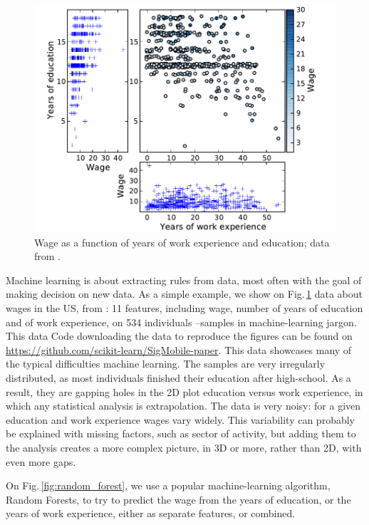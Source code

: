 \documentclass[a4paper]{article}
\begin{document}
\begin{figure}[b]
    \includegraphics[width=1.05\linewidth]{wage_data}%

    \caption{Wage as a function of years of work experience and
    education; data from \cite{berndt1991}\label{fig:data}.}
\end{figure}

Machine learning is about extracting rules from data, most often with the
goal of making decision on new data. As a simple example, we show on
Fig.\,\ref{fig:data} data about wages in the US, from \cite{berndt1991}:
11 features, including wage, number of years of education and of work
experience, on 534 individuals --samples in machine-learning
jargon. This data
Code downloading the data to reproduce the figures can be found on
\url{https://github.com/scikit-learn/SigMobile-paper}.
%
This data showcases many of the typical difficulties machine learning.
The samples are very irregularly distributed, as most individuals
finished their education after high-school. As a result, they are gapping
holes in the 2D plot education versus work experience, in which any
statistical analysis is extrapolation. The data is very noisy: for a
given education and work experience wages vary widely. This variability
can probably be explained with missing factors, such as sector of
activity, but adding them to the analysis creates a more complex picture,
in 3D or more, rather than 2D, with even more gaps.

On Fig.\,\ref{fig:random_forest}, we use a popular machine-learning
algorithm, Random Forests, to try to predict the wage from the years of
education, or the years of work experience, either as separate features,
or combined.
\end{document}

